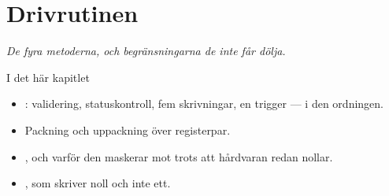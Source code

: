 \chapter{Drivrutinen}
\label{ch:driver}


{\large\itshape De fyra metoderna, och begränsningarna de inte får dölja.\par}

\begin{chapterbox}{I det här kapitlet}
\begin{itemize}
  \item {}: validering, statuskontroll, fem skrivningar, en trigger --- i den ordningen.
  \item Packning och uppackning över registerpar.
  \item {}, och varför den maskerar mot  trots att hårdvaran redan nollar.
  \item {}, som skriver noll och inte ett.
\end{itemize}
\end{chapterbox}




